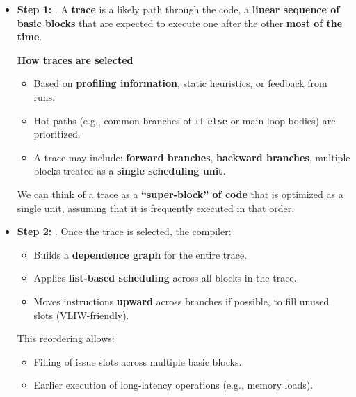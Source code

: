 \begin{itemize}
    \item \textbf{Step 1:} . A \textbf{trace} is a likely path through the code, a \textbf{linear sequence of basic blocks} that are expected to execute one after the other \textbf{most of the time}.
    \begin{flushleft}
        \textcolor{Green3}{ \textbf{How traces are selected}}
    \end{flushleft}
    \begin{itemize}
        \item Based on \textbf{profiling information}, static heuristics, or feedback from runs.
        \item Hot paths (e.g., common branches of \texttt{if}-\texttt{else} or main loop bodies) are prioritized.
        \item A trace may include: \textbf{forward branches}, \textbf{backward branches}, multiple blocks treated as a \textbf{single scheduling unit}.
    \end{itemize}
    We can think of a trace as a \textbf{``super-block'' of code} that is optimized as a single unit, assuming that it is frequently executed in that order.


    \item \textbf{Step 2:} . Once the trace is selected, the compiler:
    \begin{itemize}
        \item Builds a \textbf{dependence graph} for the entire trace.
        \item Applies \textbf{list-based scheduling} across all blocks in the trace.
        \item Moves instructions \textbf{upward} across branches if possible, to fill unused slots (VLIW-friendly).
    \end{itemize}
    This reordering allows:
    \begin{itemize}[label=\textcolor{Green3}{}]
        \item Filling of issue slots across multiple basic blocks.
        \item Earlier execution of long-latency operations (e.g., memory loads).
    \end{itemize}
\end{itemize}

